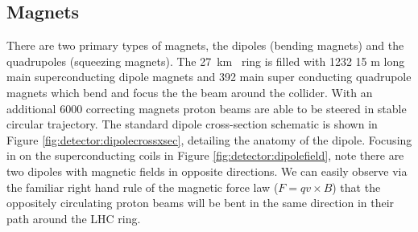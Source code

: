 \subsection{Magnets}
There are two primary types of magnets, the dipoles (bending magnets) and the quadrupoles (squeezing magnets).
The 27~km \lhc\ ring is filled with 1232 15 m long main superconducting dipole magnets and 392 main super conducting quadrupole magnets which bend and focus the the beam around the collider.
With an additional 6000 correcting magnets proton beams are able to be steered in stable circular trajectory.
The standard dipole cross-section schematic is shown in Figure \ref{fig:detector:dipolecrossxsec}, detailing the anatomy of the dipole.
Focusing in on the superconducting coils in Figure \ref{fig:detector:dipolefield}, note there are two dipoles with magnetic fields in opposite directions.
We can easily observe via the familiar right hand rule of the magnetic force law ($F=qv\times B$) that the oppositely circulating proton beams will be bent in the same direction in their path around the LHC ring.
